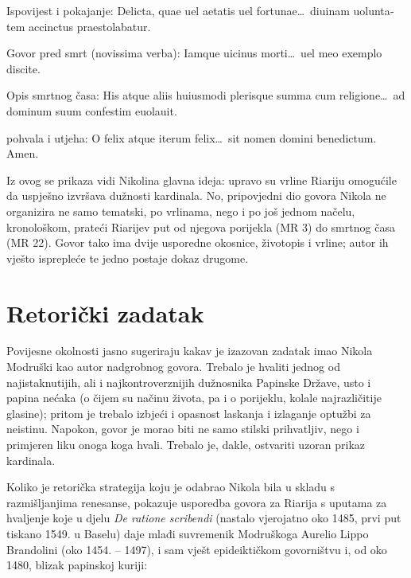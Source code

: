 \documentclass[a5paper,twoside]{article}
\begin{document}
\begin{description}[nolistsep,itemsep=3pt,font=\rmfamily]
\begin{description}[nolistsep,itemsep=3pt,font=\rmfamily]
\begin{description}[nolistsep,itemsep=3pt,font=\rmfamily]
\item[2.12.2. MR 20] Ispovijest i pokajanje: \textlatin{Delicta, quae uel aetatis uel fortunae\dots\ diuinam uoluntatem accinctus praestolabatur.}
\item[2.12.3. MR 20–21] Govor pred smrt \textlatin{(novissima verba): Iamque uicinus morti\dots\ uel meo exemplo discite.}
\item[2.12.4. MR 22] Opis smrtnog časa: \textlatin{His atque aliis huiusmodi plerisque summa cum religione\dots\ ad dominum suum confestim euolauit.}
\end{description}
\end{description}
\item[3. MR 23 Završetak (peroratio)] pohvala i utjeha: \textlatin{O felix atque iterum felix\dots\ sit nomen domini benedictum. Amen.}
\end{description}

\bigskip

Iz ovog se prikaza vidi Nikolina glavna ideja: upravo su vrline Riariju omogućile da uspješno izvršava dužnosti kardinala.  No, pripovjedni dio govora Nikola ne organizira ne samo tematski, po vrlinama, nego i po još jednom načelu, kronološkom, prateći Riarijev put od njegova porijekla (MR 3) do smrtnog časa (MR 22). Govor tako ima dvije usporedne okosnice, životopis i vrline; autor ih vješto isprepleće te jedno postaje dokaz drugome.


\section{Retorički zadatak}

Povijesne okolnosti jasno sugeriraju kakav je izazovan zadatak imao Nikola Modruški kao autor nadgrobnog govora. Trebalo je hvaliti jednog od najistaknutijih, ali i najkontroverznijih dužnosnika Papinske Države, usto i papina nećaka (o čijem su načinu života, pa i o porijeklu, kolale najrazličitije glasine); pritom je trebalo izbjeći i opasnost laskanja i izlaganje optužbi za neistinu. Napokon, govor je morao biti ne samo stilski prihvatljiv, nego i primjeren liku onoga koga hvali. Trebalo je, dakle, ostvariti uzoran prikaz kardinala.%

Koliko je retorička strategija koju je odabrao Nikola bila u skladu s razmišljanjima renesanse, pokazuje usporedba govora za Riarija s uputama za hvaljenje koje u djelu \textit{De ratione scribendi} (nastalo vjerojatno oko 1485, prvi put tiskano 1549. u Baselu) daje mlađi suvremenik Modruškoga Aurelio Lippo Brandolini (oko 1454. – 1497), i sam vješt epideiktičkom govorništvu i, od oko 1480, blizak papinskoj kuriji:
\end{document}
